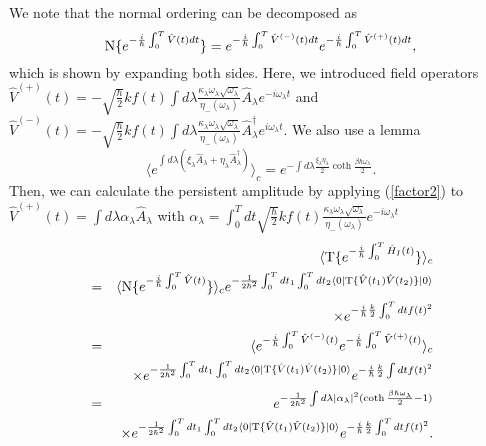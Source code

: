 \documentclass[aps,pre,twocolumn,eqsecnum,showpacs,superscriptaddress]{revtex4}
\begin{document}
We note that the normal ordering can be decomposed as
\begin{equation}
{\rm N}\{e^{-\frac{i}{\hbar}\int_0^T\hat{V}(t)dt}\}=e^{-\frac{i}{\hbar}\int_0^T\hat{V}^{(-)}(t)dt}e^{-\frac{i}{\hbar}\int_0^T\hat{V}^{(+)}(t)dt}, \label{factor1}
\end{equation}
which is shown by expanding both sides.
Here, we introduced field operators $\hat{V}^{(+)}(t)=-\sqrt{\frac{\hbar}{2}}kf(t)\int d\lambda\frac{\kappa_\lambda\omega_\lambda\sqrt{\omega_\lambda}}{\eta_-(\omega_\lambda)}\hat{A}_\lambda e^{-i\omega_\lambda t}$
and $\hat{V}^{(-)}(t)=-\sqrt{\frac{\hbar}{2}}kf(t)\int d\lambda\frac{\kappa_\lambda\omega_\lambda\sqrt{\omega_\lambda}}{\eta_-(\omega_\lambda)}\hat{A}_\lambda^\dagger e^{i\omega_\lambda t}$.
We also use a lemma\cite{Monnai2,Thirring1,Banchi1}
\begin{equation}
\langle e^{\int d\lambda(\xi_\lambda\hat{A}_\lambda+\eta_\lambda\hat{A}_\lambda^\dagger)}\rangle_c=e^{-\int d\lambda\frac{\xi_\lambda\eta_\lambda}{2}\coth\frac{\beta\hbar\omega_\lambda}{2}}. \label{factor2}
\end{equation}
Then, we can calculate the persistent amplitude by applying (\ref{factor2}) to $\hat{V}^{(+)}(t)=\int d\lambda \alpha_\lambda\hat{A}_\lambda$ with $\alpha_\lambda=\int_0^T dt\sqrt{\frac{\hbar}{2}}kf(t)\frac{\kappa_\lambda\omega_\lambda\sqrt{\omega_\lambda}}{\eta_-(\omega_\lambda)}e^{-i\omega_\lambda t}$ 
\begin{eqnarray}
&&\langle{\rm T}\{e^{-\frac{i}{\hbar}\int_0^T\hat{H}_I(t)}\}\rangle_c \nonumber \\
&=&\langle{\rm N}\{e^{-\frac{i}{\hbar}\int_0^T\hat{V}(t)}\}\rangle_c e^{-\frac{1}{2\hbar^2}\int_0^T dt_1\int_0^T dt_2\langle 0|{\rm T}\{\hat{V}(t_1)\hat{V}(t_2)\}|0\rangle} \nonumber \\
&&\times e^{-\frac{i}{\hbar}\frac{k}{2}\int_0^T dt f(t)^2} \nonumber \\
&=&\langle e^{-\frac{i}{\hbar}\int_0^T\hat{V}^{(-)}(t)}e^{-\frac{i}{\hbar}\int_0^T\hat{V}^{(+)}(t)}\rangle_c \nonumber \\
&&\times  e^{-\frac{1}{2\hbar^2}\int_0^T dt_1\int_0^T dt_2\langle 0|{\rm T}\{\hat{V}(t_1)\hat{V}(t_2)\}|0\rangle}e^{-\frac{i}{\hbar}\frac{k}{2}\int dt f(t)^2} \nonumber \\
&=&e^{-\frac{1}{2\hbar^2}\int d\lambda|\alpha_\lambda|^2(\coth\frac{\beta\hbar\omega_\lambda}{2}-1)} \nonumber \\
&&\times  e^{-\frac{1}{2\hbar^2}\int_0^T dt_1\int_0^T dt_2\langle 0|{\rm T}\{\hat{V}(t_1)\hat{V}(t_2)\}|0\rangle}e^{-\frac{i}{\hbar}\frac{k}{2}\int_0^T dt f(t)^2}. \nonumber \\
&& \label{phase2}
\end{eqnarray}
\end{document}

